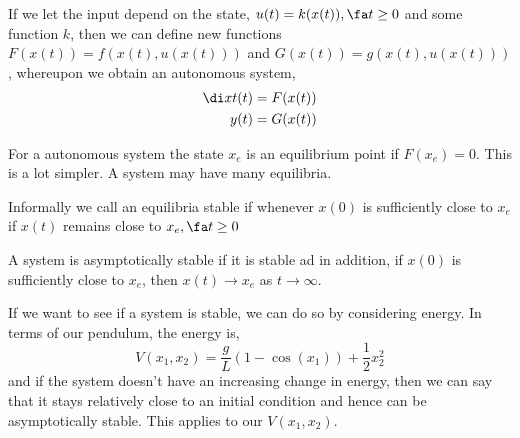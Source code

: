 If we let the input depend on the state, $u(t) = k(x(t)), \fa t \ge 0$ and some function $k$, then we can define new functions $F(x(t)) = f(x(t), u(x(t)))$ and $G(x(t)) = g(x(t), u(x(t)))$, whereupon we obtain an autonomous system,
\begin{align*}
  \di x t (t) &= F(x(t))\\
  y(t) &= G(x(t))
\end{align*}

For a autonomous system the state $x_e$ is an equilibrium point if $F(x_e) = 0$. This is a lot simpler. A system may have many equilibria.

\begin{ndefi}[Stability]
  Informally we call an equilibria stable if whenever $x(0)$ is sufficiently close to $x_e$ if $x(t)$ remains close to $x_e, \fa t \ge 0$
\end{ndefi}

\begin{ndefi}
  A system is asymptotically stable if it is stable ad in addition, if $x(0)$ is sufficiently close to $x_e$, then $x(t) \to x_e$ as $t \to \infty$.
\end{ndefi}

If we want to see if a system is stable, we can do so by considering energy. In terms of our pendulum, the energy is,
$$ V(x_1, x_2) = \frac{g}{L}(1 - \cos(x_1)) + \frac{1}{2}x_2^2 $$
and if the system doesn't have an increasing change in energy, then we can say that it stays relatively close to an initial condition and hence can be asymptotically stable. This applies to our $V(x_1, x_2)$.
